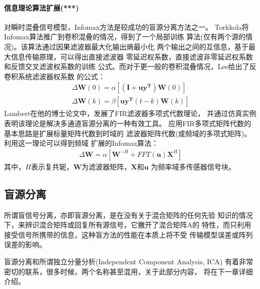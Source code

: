 \paragraph*{信息理论算法扩展(***)}
对瞬时混叠信号模型，Infomax方法是较成功的盲源分离方法之一。
Torkkola将Infomax算法推广到卷积混叠的情况，得到了一个局部训练
算法(仅有两个源的情况)。该算法通过因果滤波器最大化输出熵最小化
两个输出之间的互信息，基于最大信息传输原理，可以得出直接滤波器
零延迟权系数，直接滤波非零延迟权系数和反馈交叉滤波权系数的训练
公式。而对于更一般的卷积混叠情况，Lee给出了反卷积系统滤波器权系数
的公式：
\begin{eqnarray}
\Delta\bm{W}(0)	= \alpha [\bm{(I+uy^T)W}(0)] \\
\Delta\bm{W}(k)	= \beta [\bm{uy^T}(t-k)\bm{W}(k)]
\end{eqnarray}
Lambert在他的博士论文中，发展了FIR滤波器多项式代数理论，
并通过仿真实例表明该理论是解决多通道盲源分离的一种有效工具。
应用FIR多项式矩阵代数的基本思路是扩展标量矩阵代数到时域的
滤波器矩阵代数(或频域的多项式矩阵)。利用这一理论可以得到频域
扩展的Infomax算法：
\begin{eqnarray}
\Delta\bm{W} = \alpha [\bm{W}^{-H}+FFT(\bm{u})\bm{X}^H]
\end{eqnarray}
其中，$H$表示复共轭，$\bm{W}$为滤波器矩阵，$\bm{X}$和$\bm{u}$
为频率域多传感器信号块。

\subsection{盲源分离}
所谓盲信号分离，亦即盲源分离，是在没有关于混合矩阵的任何先验
知识的情况下，来辨识混合矩阵或回复所有源信号，它撇开了混合矩阵A的
特性，而只利用接受信号所携带的信息，这种盲方法的性能在本质上将不受
传输模型误差或阵列误差的影响。

盲源分离和所谓独立分量分析(Independent Component Analysis, ICA)
有着非常密切的联系，很多时候，两个名称甚至混用，关于此部分内容，
将在下一章详细介绍。
































